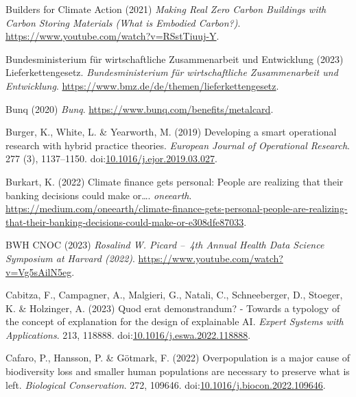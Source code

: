 \documentclass[
  letterpaper,
  DIV=11,
  numbers=noendperiod]{scrartcl}
\newlength{\cslhangindent}
\newenvironment{CSLReferences}[2] %
 {\begin{list}{}{%
  \setlength{\itemindent}{0pt}
  \setlength{\leftmargin}{0pt}
  \setlength{\parsep}{0pt}
  \ifodd #1
   \setlength{\leftmargin}{\cslhangindent}
   \setlength{\itemindent}{-1\cslhangindent}
  \fi
  \setlength{\itemsep}{#2\baselineskip}}}
 {\end{list}}
\begin{document}
\begin{CSLReferences}{0}{1}
Builders for Climate Action (2021) \emph{Making {Real Zero Carbon
Buildings} with {Carbon Storing Materials} ({What} is {Embodied
Carbon}?)}. \url{https://www.youtube.com/watch?v=RSstTiuuj-Y}.

Bundesministerium für wirtschaftliche Zusammenarbeit und Entwicklung
(2023) {Lieferkettengesetz}. \emph{Bundesministerium f{ü}r
wirtschaftliche Zusammenarbeit und Entwicklung}.
\url{https://www.bmz.de/de/themen/lieferkettengesetz}.

Bunq (2020) \emph{Bunq}. \url{https://www.bunq.com/benefits/metalcard}.

Burger, K., White, L. \& Yearworth, M. (2019) Developing a smart
operational research with hybrid practice theories. \emph{European
Journal of Operational Research}. 277 (3), 1137--1150.
doi:\href{https://doi.org/10.1016/j.ejor.2019.03.027}{10.1016/j.ejor.2019.03.027}.

Burkart, K. (2022) Climate finance gets personal: People are realizing
that their banking decisions could make or{\ldots{}}. \emph{oneearth}.
\url{https://medium.com/oneearth/climate-finance-gets-personal-people-are-realizing-that-their-banking-decisions-could-make-or-e308dfe87033}.

BWH CNOC (2023) \emph{Rosalind {W}. {Picard} --~4th {Annual Health Data
Science Symposium} at {Harvard} (2022)}.
\url{https://www.youtube.com/watch?v=Vg5sAilN5eg}.

Cabitza, F., Campagner, A., Malgieri, G., Natali, C., Schneeberger, D.,
Stoeger, K. \& Holzinger, A. (2023) Quod erat demonstrandum? - {Towards}
a typology of the concept of explanation for the design of explainable
{AI}. \emph{Expert Systems with Applications}. 213, 118888.
doi:\href{https://doi.org/10.1016/j.eswa.2022.118888}{10.1016/j.eswa.2022.118888}.

Cafaro, P., Hansson, P. \& Götmark, F. (2022) Overpopulation is a major
cause of biodiversity loss and smaller human populations are necessary
to preserve what is left. \emph{Biological Conservation}. 272, 109646.
doi:\href{https://doi.org/10.1016/j.biocon.2022.109646}{10.1016/j.biocon.2022.109646}.


\end{CSLReferences}
\end{document}
